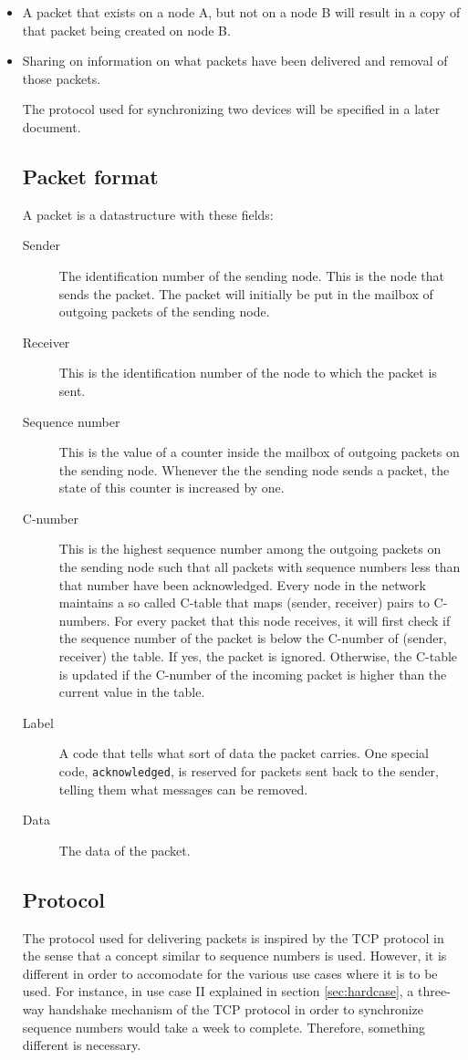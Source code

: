 \documentclass{article}
\begin{document}
\begin{itemize}
  \item A packet that exists on a node A, but not on a node B will result in a copy of that packet being created on node B.
  \item Sharing on information on what packets have been delivered and removal of those packets.
\begin{itemize}
The protocol used for synchronizing two devices will be specified in a later document.

\subsection{Packet format}
A packet is a datastructure with these fields:
\begin{description}
  \item[Sender] The identification number of the sending node. This is the node that sends the packet. The packet will initially be put in the mailbox of outgoing packets of the sending node.
  \item[Receiver] This is the identification number of the node to which the packet is sent.
  \item[Sequence number] This is the value of a counter inside the mailbox of outgoing packets on the sending node. Whenever the the sending node sends a packet, the state of this counter is increased by one.
  \item[C-number] This is the highest sequence number among the outgoing packets on the sending node such that all packets with sequence numbers less than that number have been acknowledged. Every node in the network maintains a so called C-table that maps (sender, receiver) pairs to C-numbers. For every packet that this node receives, it will first check if the sequence number of the packet is below the C-number of (sender, receiver) the table. If yes, the packet is ignored. Otherwise, the C-table is updated if the C-number of the incoming packet is higher than the current value in the table.
  \item[Label] A code that tells what sort of data the packet carries. One special code, \texttt{acknowledged}, is reserved for packets sent back to the sender, telling them what messages can be removed.
  \item[Data] The data of the packet.
\end{description}


\subsection{Protocol}
The protocol used for delivering packets is inspired by the TCP protocol in the sense that a concept similar to sequence numbers is used. However, it is different in order to accomodate for the various use cases where it is to be used. For instance, in use case II explained in section \ref{sec:hardcase}, a three-way handshake mechanism of the TCP protocol in order to synchronize sequence numbers would take a week to complete. Therefore, something different is necessary.


\end{itemize}
\end{itemize}
\end{document}
